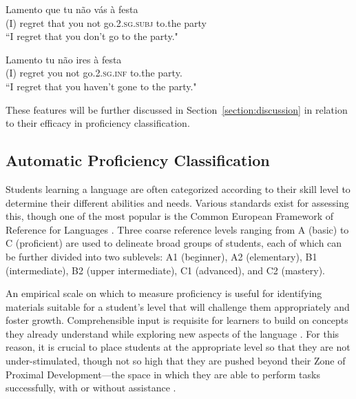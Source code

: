 \begin{exe}
\ex\label{inflinf1}
\gll Lamento que tu não vás à festa \\
{(I) regret} that you not go.{\scshape 2.sg.subj} to.the party \\
\glt ``I regret that you don’t go to the party." \citep{inflinf}

\ex\label{inflinf2}
\gll Lamento tu não ires à festa \\
{(I) regret} you not go.{\scshape 2.sg.inf} to.the party. \\
\glt ``I regret that you haven’t gone to the party." \citep{inflinf}
\end{exe}

These features will be further discussed in Section~\ref{section:discussion} in relation to their efficacy in proficiency classification.


\subsection{Automatic Proficiency Classification}


Students learning a language are often categorized according to their skill level to determine their different abilities and needs. Various standards exist for assessing this, though one of the most popular is the Common European Framework of Reference for Languages . Three coarse reference levels ranging from A (basic) to C (proficient) are used to delineate broad groups of students, each of which can be further divided into two sublevels: A1 (beginner), A2 (elementary), B1 (intermediate), B2 (upper intermediate), C1 (advanced), and C2 (mastery).

An empirical scale on which to measure proficiency is useful for identifying materials suitable for a student's level that will challenge them appropriately and foster growth. Comprehensible input is requisite for learners to build on concepts they already understand while exploring new aspects of the language \citep[$i+\text{1}$;][]{krashen1981}. For this reason, it is crucial to place students at the appropriate level so that they are not under-stimulated, though not so high that they are pushed beyond their Zone of Proximal Development—the space in which they are able to perform tasks successfully, with or without assistance \citep{vygotsky1986}.

